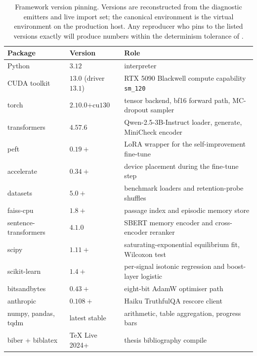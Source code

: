 \begin{table}[!ht]
\centering\footnotesize
\setlength{\tabcolsep}{5pt}
\renewcommand{\arraystretch}{1.1}
\begin{tabular}{@{}p{5.0cm}p{3.0cm}p{5.5cm}@{}}
\toprule
\textbf{Package} & \textbf{Version} & \textbf{Role} \\
\midrule
Python                & $3.12$                   & interpreter \\
CUDA toolkit          & $13.0$ (driver $13.1$)   & RTX 5090 Blackwell compute capability \texttt{sm\_120} \\
\midrule
torch                 & $2.10.0\text{+cu130}$    & tensor backend, bf16 forward path, MC-dropout sampler \\
transformers          & $4.57.6$                 & Qwen-2.5-3B-Instruct loader, generate, MiniCheck encoder \\
peft                  & $0.19+$                  & LoRA wrapper for the self-improvement fine-tune \\
accelerate            & $0.34+$                  & device placement during the fine-tune step \\
\midrule
datasets              & $5.0+$                   & benchmark loaders and retention-probe shuffles \\
faiss-cpu             & $1.8+$                   & passage index and episodic memory store \\
sentence-transformers & $4.1.0$                  & SBERT memory encoder and cross-encoder reranker \\
\midrule
scipy                 & $1.11+$                  & saturating-exponential equilibrium fit, Wilcoxon test \\
scikit-learn          & $1.4+$                   & per-signal isotonic regression and boost-layer logistic \\
\midrule
bitsandbytes          & $0.43+$                  & eight-bit AdamW optimiser path \\
anthropic             & $0.108+$                 & Haiku TruthfulQA rescore client \\
numpy, pandas, tqdm   & latest stable            & arithmetic, table aggregation, progress bars \\
\midrule
biber + biblatex      & TeX Live 2024+           & thesis bibliography compile \\
\bottomrule
\end{tabular}
\caption[Framework version pinning]{Framework version pinning. Versions are reconstructed from the diagnostic emitters and live import set; the canonical environment is the virtual environment on the production host. Any reproducer who pins to the listed versions exactly will produce numbers within the determinism tolerance of .}
\label{tab:app-repro-versions}
\end{table}

